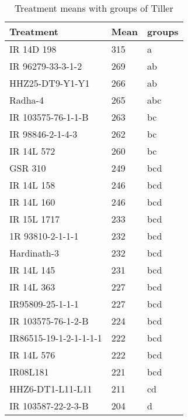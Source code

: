 \documentclass[]{article}
\begin{document}
\begin{longtable}{lll}
\caption{\label{tab:two-fac-groups-tab2}Treatment means with groups of Tiller}\\
\toprule
Treatment & Mean & groups\\
\midrule
\rowcolor{gray!6}  IR 14D 198 & 315 & a\\
IR 96279-33-3-1-2 & 269 & ab\\
\rowcolor{gray!6}  HHZ25-DT9-Y1-Y1 & 266 & ab\\
Radha-4 & 265 & abc\\
\rowcolor{gray!6}  IR 103575-76-1-1-B & 263 & bc\\
\addlinespace
IR 98846-2-1-4-3 & 262 & bc\\
\rowcolor{gray!6}  IR 14L 572 & 260 & bc\\
GSR 310 & 249 & bcd\\
\rowcolor{gray!6}  IR 14L 158 & 246 & bcd\\
IR 14L 160 & 246 & bcd\\
\addlinespace
\rowcolor{gray!6}  IR 15L 1717 & 233 & bcd\\
1R 93810-2-1-1-1 & 232 & bcd\\
\rowcolor{gray!6}  Hardinath-3 & 232 & bcd\\
IR 14L 145 & 231 & bcd\\
\rowcolor{gray!6}  IR 14L 363 & 227 & bcd\\
\addlinespace
IR95809-25-1-1-1 & 227 & bcd\\
\rowcolor{gray!6}  IR 103575-76-1-2-B & 224 & bcd\\
IR86515-19-1-2-1-1-1-1 & 222 & bcd\\
\rowcolor{gray!6}  IR 14L 576 & 222 & bcd\\
IR08L181 & 221 & bcd\\
\addlinespace
\rowcolor{gray!6}  HHZ6-DT1-L11-L11 & 211 & cd\\
IR 103587-22-2-3-B & 204 & d\\
\bottomrule
\end{longtable}
\endgroup{}
\begingroup\fontsize{12}{14}\selectfont
\end{document}
